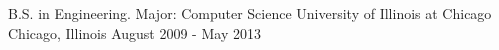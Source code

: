 \begin{cveducations}
  \cveducation
    {B.S. in Engineering. Major: Computer Science}
    {University of Illinois at Chicago}
    {Chicago, Illinois}
    {August 2009 - May 2013}
\end{cveducations}
